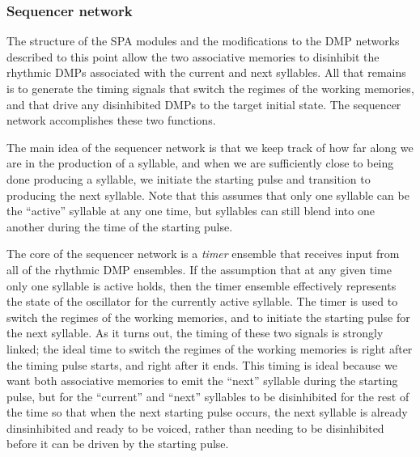 \subsubsection{Sequencer network}

The structure of the SPA modules
and the modifications to the DMP networks
described to this point
allow the two associative memories
to disinhibit the rhythmic DMPs
associated with the current and next syllables.
All that remains is to generate
the timing signals that switch
the regimes of the working memories,
and that drive any disinhibited DMPs
to the target initial state.
The sequencer network
accomplishes these two functions.

The main idea of the sequencer network
is that we keep track of
how far along we are in the
production of a syllable,
and when we are sufficiently
close to being done producing a syllable,
we initiate the starting pulse
and transition to producing
the next syllable.
Note that this assumes that
only one syllable can be the
``active'' syllable at any one time,
but syllables can still
blend into one another
during the time of
the starting pulse.

The core of the sequencer network
is a \textit{timer} ensemble
that receives input from
all of the rhythmic DMP ensembles.
If the assumption that
at any given time
only one syllable is active holds,
then the timer ensemble effectively
represents the state of the oscillator
for the currently active syllable.
The timer is used to
switch the regimes of the working memories,
and to initiate the starting pulse
for the next syllable.
As it turns out, the timing
of these two signals is strongly linked;
the ideal time to switch the regimes
of the working memories
is right after the timing pulse starts,
and right after it ends.
This timing is ideal because
we want both associative memories
to emit the ``next'' syllable
during the starting pulse,
but for the ``current'' and ``next'' syllables
to be disinhibited for the rest
of the time so that when the next
starting pulse occurs,
the next syllable is already dinsinhibited
and ready to be voiced,
rather than needing to be disinhibited
before it can be driven by the starting pulse.

